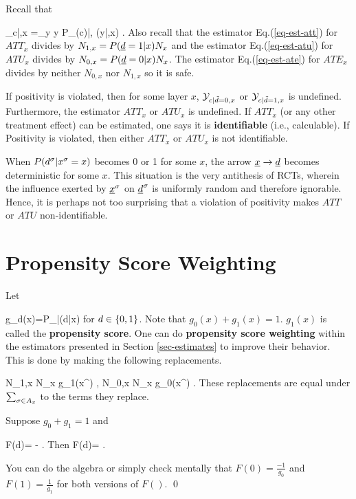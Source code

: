 Recall that

\beq
\caly_{c|\td ,x}
=\sum_{y} y P_{\rvy(c)|\rvtd, \rvx}(y|\td,x)
\;.
\eeq
Also recall
that the estimator
Eq.(\ref{eq-est-att})
for $ATT_x$ divides by $N_{1,x}=P({\underline{d}}=1|x)N_x$
and 
the estimator
Eq.(\ref{eq-est-atu})
for $ATU_x$ divides by $N_{0,x}= P({\underline{d}}=0|x)N_x$.
The estimator Eq.(\ref{eq-est-ate})
for $ATE_x$ divides by neither $N_{0,x}$
nor $N_{1,x}$ so it is safe.

If positivity is violated,
then 
for some 
layer $x$, 
 ${\cal Y}_{c|{\tilde{d}} =0,x}$ or ${\cal Y}_{c|{\tilde{d}} =1,x}$ 
is undefined. 
Furthermore,  the estimator
$ATT_x$ or $ATU_x$ is undefined.
If $ATT_x$ (or any
other treatment effect)  can be estimated,
one says it is {\bf identifiable} (i.e.,
calculable). If Positivity is violated, then
either $ATT_x$ or $ATU_x$ is not identifiable.

 

When 
$P(d^\sigma|x^\sigma=x)$ 
becomes 0 or 1 for some $x$,
the arrow
${\underline{x}}\rightarrow{\underline{d}}$
becomes deterministic
for some $x$.
This situation
is
the very 
antithesis
of RCTs,
wherein 
the influence
exerted by ${\underline{x}}^\sigma$ on 
${\underline{d}}^\sigma$ is uniformly
random and therefore ignorable.
Hence, it is perhaps 
not too surprising
that a violation
of positivity makes
$ATT$ or $ATU$
non-identifiable.

\section{Propensity Score
Weighting}

Let 

\beq
g_d(x)=P_{\rvd|\rvx}(d|x)
\eeq
 for $d\in\{0,1\}$.
Note that $g_0(x)+g_1(x)=1$.
$g_1(x)$ is called the {\bf propensity score}.
One can do {\bf propensity score weighting}
within the estimators
presented in Section 
\ref{sec-estimates} to
improve their behavior.
This is done by making the
following replacements.

\beq
N_{1,x}
\rarrow
N_x g_1(x^\s)
\;,\;\;
N_{0,x}
\rarrow
N_x g_0(x^\s)
\;.
\eeq
These replacements are
equal under $ \sum_{\sigma\in A_x}$
to the terms they replace.

\begin{claim}
\label{cl-d-line}
Suppose $g_0+g_1=1$ and

\beq F(d)=
-
\;.
\eeq
Then
\beq
F(d)=
\;.
\eeq
\end{claim}
\proof
You can do the algebra
or simply check mentally that
$F(0)=\frac{-1}{g_0}$
and $F(1)=\frac{1}{g_1}$
for both versions of $F()$.
\qed

